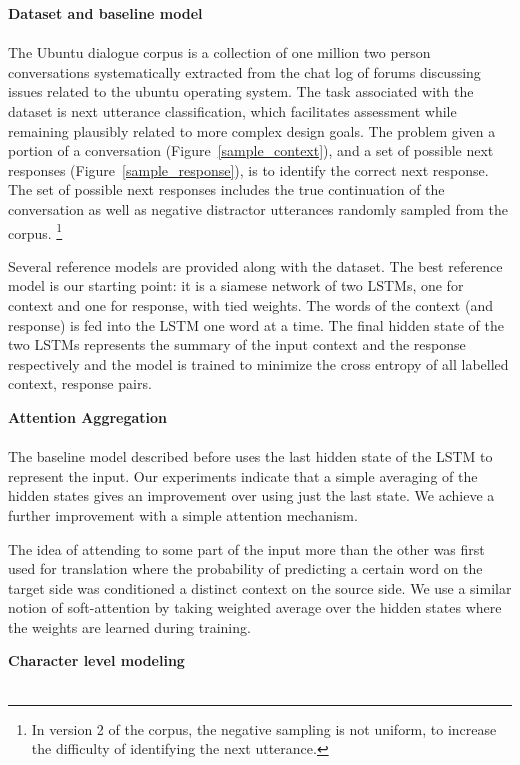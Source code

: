 \documentclass[11pt]{article}
\begin{document}
\textbf{Dataset and baseline model}\\\\

The Ubuntu dialogue corpus is a collection of one million two
person conversations systematically extracted from the chat log
of forums discussing issues related to the ubuntu operating system.
The task associated with the dataset is next utterance classification,
which facilitates assessment while remaining plausibly related to more
complex design goals.  The problem given a portion of a conversation (Figure~\ref{sample_context}), and a set of possible next
responses (Figure~\ref{sample_response}), is to identify the correct next response.  The set of possible
next responses includes the true continuation of the conversation as well
as negative distractor utterances randomly sampled from the corpus.
\footnote{In version 2 of the corpus, the negative sampling is not
uniform, to increase the difficulty of identifying the next utterance.}

Several reference models are provided along with the dataset.  The best
reference model is our starting point: it is a siamese network of two
LSTMs, one for context and one for response, with tied weights. The
words of the context (and response) is fed into the LSTM one word at a
time. The final hidden state of the two LSTMs represents the summary of the
input context and the response respectively and the model is trained to
minimize the cross entropy of all labelled context, response pairs.

\textbf{Attention Aggregation}\label{attention_aggregation}\\\\

The baseline model described before uses the last hidden state of the LSTM
to represent the input. Our experiments indicate that a simple averaging
of the hidden states gives an improvement over using just the last state.
We achieve a further improvement with a simple attention mechanism.

The idea of attending to some part of the input more than the other was first used for translation \cite{DBLP:journals/corr/BahdanauCB14} where the probability of predicting a certain word on the target side was conditioned a distinct context on the source side. We use a similar notion of soft-attention by taking weighted average over the hidden states where the weights are learned during training. 

\textbf{Character level modeling}\label{character_level_modeling}\\\\
\end{document}
